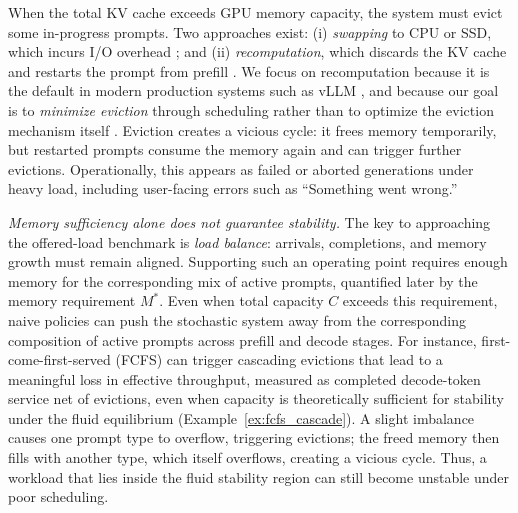 When the total KV cache exceeds GPU memory capacity, the system must evict some in-progress prompts. Two approaches exist: (i) \emph{swapping} to CPU or SSD, which incurs I/O overhead \citep{sheng2023flexgen, aminabadi2022deepspeed}; and (ii) \emph{recomputation}, which discards the KV cache and restarts the prompt from prefill \citep{kwon2023efficient}. We focus on recomputation because it is the default in modern production systems such as vLLM \citep{vllm-v1-2025}, and because our goal is to \emph{minimize eviction} through scheduling rather than to optimize the eviction mechanism itself \citep{li2025mirage}. Eviction creates a vicious cycle: it frees memory temporarily, but restarted prompts consume the memory again and can trigger further evictions. Operationally, this appears as failed or aborted generations under heavy load, including user-facing errors such as ``Something went wrong.''

\emph{Memory sufficiency alone does not guarantee stability.} The key to approaching the offered-load benchmark is \emph{load balance}: arrivals, completions, and memory growth must remain aligned. Supporting such an operating point requires enough memory for the corresponding mix of active prompts, quantified later by the memory requirement \(M^*\). Even when total capacity \(C\) exceeds this requirement, naive policies can push the stochastic system away from the corresponding composition of active prompts across prefill and decode stages. For instance, first-come-first-served (FCFS) can trigger cascading evictions that lead to a meaningful loss in effective throughput, measured as completed decode-token service net of evictions, even when capacity is theoretically sufficient for stability under the fluid equilibrium (Example~\ref{ex:fcfs_cascade}). A slight imbalance causes one prompt type to overflow, triggering evictions; the freed memory then fills with another type, which itself overflows, creating a vicious cycle. Thus, a workload that lies inside the fluid stability region can still become unstable under poor scheduling.

